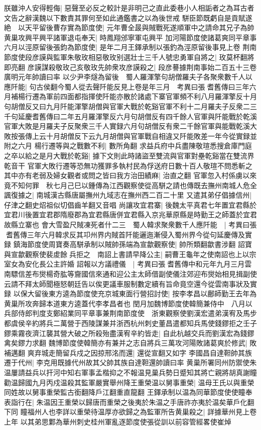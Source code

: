 朕雖沖人安得輕侮|{
	惡聲至必反之較計是非明己之直此委巷小人相詬者之為耳古者文告之辭漢魏以下數責其罪何至如此通鑑書之以為後世戒}
駢臣節既虧自是貢賦遂絶　以天平留後曹存實為節度使|{
	元年曹全晸與賊戰死遂順軍中之請命其兄子為帥}
黄巢攻興平興平諸軍退屯奉天|{
	時鳳翔邠寧軍屯興平}
加河陽節度使諸葛爽同平章事　六月以涇原留後張鈞為節度使|{
	是年二月王鐸承制以張釣為涇原留後事見上卷}
荆南節度使段彦謨與監軍朱敬玫相惡敬玫别選壯士三千人號忠勇軍自將之|{
	玫莫杯翻將即亮翻}
彦謨謀殺敬玫己亥敬玫先帥衆攻彦謨殺之|{
	段彦謩據荆南事始二百五十三卷廣明元年帥讀曰率}
以少尹李燧為留後　蜀人羅渾擎句胡僧羅夫子各聚衆數千人以應阡能|{
	句古侯翻今蜀人從去聲阡能反見上卷是年三月　考異曰張耆舊傳曰三年六月補楊行遷為軍前四面都指揮使阡能亦散於諸處下寨官軍頻不利八月羅渾擎反十月句胡僧反又曰九月阡能渾擎胡僧與官軍大戰於乾谿官軍不利十二月羅夫子反衆二三千句延慶耆舊傳曰二年五月羅渾擎反六月句胡僧反有四千餘人官軍與阡能戰於乾溪官軍大敗是月羅夫子反聚衆三千人實録六月句胡僧反有衆二千餘官軍與能戰乾溪大敗按張傳上云十月胡僧反下云九月胡僧與官軍戰自相違又阡能敗差一年今從實録並附之六月}
楊行遷等與之戰數不利|{
	數所角翻}
求益兵府中兵盡陳敬瑄悉搜倉庫門庭之卒以給之是月大戰於乾谿|{
	據下文則此時諸盜至雙流與官軍對壘乾谿當在雙流界乾音干}
官軍大敗行遷等恐無功獲罪多執村民為俘送府日數十百人敬瑄不問悉斬之其中亦有老弱及婦女觀者或問之皆曰我方治田績麻|{
	治直之翻}
官軍忽入村係虜以來竟不知何罪　秋七月己巳以鍾傳為江西觀察使從高駢之請也傳既去撫州南城人危全諷復據之|{
	南城漢古縣唐屬撫州九域志在撫州西二百二十里}
又遣其弟仔倡據信州|{
	仔津之翻史炤祖似切倡齒羊翻又音唱}
尚讓攻宜君寨|{
	後魏太平真君七年置宜君縣於宜君川後置宜君郡隋廢郡為宜君縣唐併宜君縣入京兆華原縣是時勤王之師蓋於宜君故縣立寨也}
會大雪盈尺賊凍死者什二三　蜀人韓求聚衆數千人應阡能　|{
	考異曰張耆舊傳三年六月韓求反其卭州界内賊首阡能邐迤漸侵入蜀州界今從句延慶傳及實録}
鎮海節度使周寶奏高駢承制以賊帥孫端為宣歙觀察使|{
	帥所類翻歙書涉翻}
詔寶與宣歙觀察使裴䖍餘兵拒之　南詔上書請早降公主|{
	嗣曹王龜年之使南詔也上以宗室女為安化長公主許婚}
詔報以方議禮儀　|{
	考異曰張耆舊傳中和元年九月三月雲南驃信差布爕楊奇肱等齎國信來通和迎公主太師借副使儀注郊迎布爕始相見揖副使云請不拜太師聞極怒朝廷告以俟更議車服制數定續有旨命竟空還今從雲南事狀及實録}
以保大留後東方逵為節度使充京城東面行營招討使|{
	按李孝昌以鄜師勤王去年為黄巢所攻奔歸本道東方逵蓋代李孝昌者也}
閏月加魏博節度使韓簡兼侍中　八月以兵部侍郎判度支鄭紹業同平章事兼荆南節度使　浙東觀察使劉漢宏遣弟漢宥及馬步都虞侯辛約將兵二萬營于西陵謀兼并浙西杭州刺史董昌遣都知兵馬使錢鏐拒之壬子鏐乘霧夜濟江襲其營大破之所殺殆盡漢宥辛約皆走|{
	自此杭越交兵而劉漢宏為錢鏐禽矣鏐力求翻}
魏博節度使韓簡亦有兼并之志自將兵三萬攻河陽敗諸葛爽於修武|{
	敗補邁翻}
爽弃城走簡留兵戍之因掠邢洺而還|{
	還從宣翻又如字}
李國昌自達靼帥其族遷于代州|{
	李克用既據代州故其父帥其族自達靼還帥讀曰率}
黄巢所署同州防禦使朱温屢請益兵以扞河中知右軍事孟楷抑之不報温見巢兵勢日蹙知其將亡親將胡真謝瞳勸温歸國九月丙戍温殺其監軍嚴實舉州降王重榮温以舅事重榮|{
	温母王氏以與重榮同姓故以舅事重榮監古銜翻降戶江翻重直龍翻}
王鐸承制以温為同華節度使使瞳奉表詣行在|{
	朱温因王重榮以歸唐而重榮之後夷於朱温之手唐祚亦夷於温矣華戶化翻下同}
瞳福州人也李詳以重榮待温厚亦欲歸之為監軍所告黄巢殺之|{
	詳據華州見上卷上年}
以其弟思鄴為華州刺史桂州軍亂逐節度使張從訓以前容管經畧使崔焯

